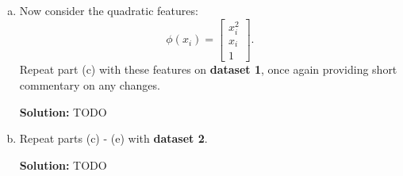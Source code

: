 \documentclass{article}
\newenvironment{solution}{\color{blue} \smallskip \textbf{Solution:}}{}
\begin{document}
\begin{enumerate}[(a)]
    \item 
    Now consider the quadratic features:
    \[
        \phi(x_i) = \begin{bmatrix}
            x_i^2 \\
            x_i \\
            1
        \end{bmatrix}.
    \]
    Repeat part (c) with these features on \textbf{dataset 1}, once again providing short commentary on any changes.
    
    \begin{solution}
        TODO
    \end{solution}
    
    \item
    Repeat parts (c) - (e) with \textbf{dataset 2}.
    
    \begin{solution}
        TODO
    \end{solution}
    

\end{enumerate}
\end{document}
